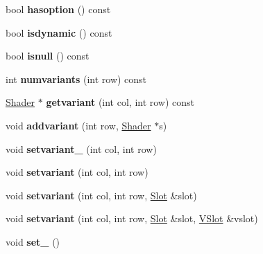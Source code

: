\begin{DoxyCompactItemize}
\mbox{\label{struct_shader_a3367214c0f2fa3af8a5c7f6f23f97ead}} 
bool {\bfseries hasoption} () const
\item 
\mbox{\label{struct_shader_afea4fa8e8c6a7610518ca0a2eaf4de1a}} 
bool {\bfseries isdynamic} () const
\item 
\mbox{\label{struct_shader_abbe9aba15a22e931ec4fb95f05291a93}} 
bool {\bfseries isnull} () const
\item 
\mbox{\label{struct_shader_af68b0ca57149870b50ab3bb681e4c8db}} 
int {\bfseries numvariants} (int row) const
\item 
\mbox{\label{struct_shader_a4fd0c9cbfe16f4e9620596070e8201be}} 
\hyperlink{struct_shader}{Shader} $\ast$ {\bfseries getvariant} (int col, int row) const
\item 
\mbox{\label{struct_shader_aca0e2b1ce5ecefd2142145183bac3cee}} 
void {\bfseries addvariant} (int row, \hyperlink{struct_shader}{Shader} $\ast$s)
\item 
\mbox{\label{struct_shader_af06bab06416b30f18ab9140af6d048e1}} 
void {\bfseries setvariant\+\_\+} (int col, int row)
\item 
\mbox{\label{struct_shader_ae97edab51c5ce882e4e83f218a73b4b5}} 
void {\bfseries setvariant} (int col, int row)
\item 
\mbox{\label{struct_shader_a5b070c999fc466e16facf8cb6c95d6d4}} 
void {\bfseries setvariant} (int col, int row, \hyperlink{struct_slot}{Slot} \&slot)
\item 
\mbox{\label{struct_shader_ac2244aa83aa0f4aa9e2bbf95a8a8b204}} 
void {\bfseries setvariant} (int col, int row, \hyperlink{struct_slot}{Slot} \&slot, \hyperlink{struct_v_slot}{V\+Slot} \&vslot)
\item 
\mbox{\label{struct_shader_af11fc70623aec838db49294c3dd2bf26}} 
void {\bfseries set\+\_\+} ()
\item 
\mbox{\label{struct_shader_af38b132b131208d3aeec4841b4d0d117}} 

\end{DoxyCompactItemize}
